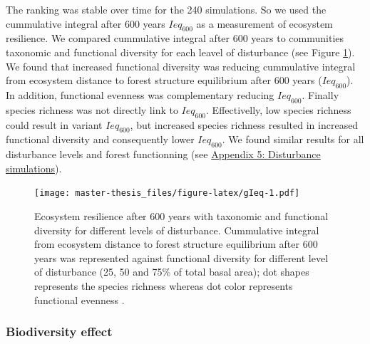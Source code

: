 \documentclass[12pt,]{article}
\theoremstyle{definition}
\theoremstyle{definition}
\theoremstyle{remark}
\begin{document}
The ranking was stable over time for the 240 simulations. So we used the
cummulative integral after 600 years \(Ieq_{600}\) as a measurement of
ecosystem resilience. We compared cummulative integral after 600 years
to communities taxonomic and functional diversity for each leavel of
disturbance (see Figure \ref{fig:gIeq}). We found that increased
functional diversity \citep[FDiv,][]{villeger_new_2008} was reducing
cummulative integral from ecosystem distance to forest structure
equilibrium after 600 years (\(Ieq_{600}\)). In addition, functional
evenness was complementary reducing \(Ieq_{600}\). Finally species
richness was not directly link to \(Ieq_{600}\). Effectivelly, low
species richness could result in variant \(Ieq_{600}\), but increased
species richness resulted in increased functional diversity and
consequently lower \(Ieq_{600}\). We found similar results for all
disturbance levels and forest functionning (see
\protect\hyperlink{appendix-5-disturbance-simulations}{Appendix 5:
Disturbance simulations}).

\begin{figure}[htbp]
\centering
\texttt{[image: master-thesis\_files/figure-latex/gIeq-1.pdf]}
\caption{\label{fig:gIeq}Ecosystem resilience after 600 years with taxonomic
and functional diversity for different levels of disturbance.
Cummulative integral from ecosystem distance to forest structure
equilibrium after 600 years was represented against functional diversity
\citep[FDiv,][]{villeger_new_2008} for different level of disturbance
(25, 50 and 75\% of total basal area); dot shapes represents the species
richness whereas dot color represents functional evenness
\citep[FEve,][]{villeger_new_2008}.}
\end{figure}

\subsubsection{Biodiversity effect}\label{biodiversity-effect-1}
\end{document}
